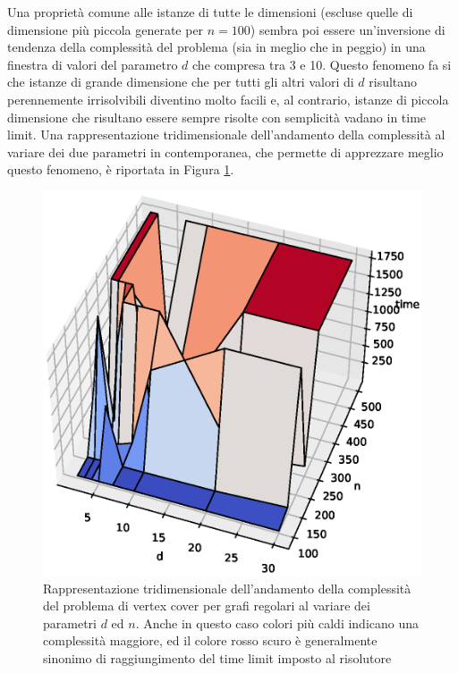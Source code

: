 Una proprietà comune alle istanze di tutte le dimensioni (escluse quelle di dimensione più piccola generate per $n=100$) sembra poi essere un'inversione di tendenza della complessità del problema (sia in meglio che in peggio) in una finestra di valori del parametro $d$ che compresa tra 3 e 10. Questo fenomeno fa si che istanze di grande dimensione che per tutti gli altri valori di $d$ risultano perennemente irrisolvibili diventino molto facili e, al contrario, istanze di piccola dimensione che risultano essere sempre risolte con semplicità vadano in time limit. Una rappresentazione tridimensionale dell'andamento della complessità al variare dei due parametri in contemporanea, che permette di apprezzare meglio questo fenomeno, è riportata in Figura \ref{fig:rrg3d}.

\begin{figure}[h!]
     \centering
       \includegraphics[scale=0.5]{images/rrg3d.eps}
       \caption{Rappresentazione tridimensionale dell'andamento della complessità del problema di vertex cover per grafi regolari al variare dei parametri $d$ ed $n$. Anche in questo caso colori più caldi indicano una complessità maggiore, ed il colore rosso scuro è generalmente sinonimo di raggiungimento del time limit imposto al risolutore}      
        \label{fig:rrg3d}
\end{figure}

